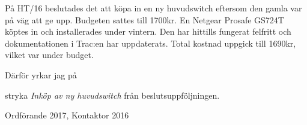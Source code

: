 \documentclass[../_main/handlingar.tex]{subfiles}
\begin{document}

På HT/16 beslutades det att köpa in en ny huvudswitch eftersom den gamla var på väg att ge upp. Budgeten sattes till 1700kr. En Netgear Prosafe GS724T köptes in och installerades under vintern. Den har hittills fungerat felfritt och dokumentationen i Trac:en har uppdaterats. Total kostnad uppgick till 1690kr, vilket var under budget.

Därför yrkar jag på

\begin{attsatser}
    \att stryka \emph{Inköp av ny huvudswitch} från beslutsuppföljningen.
\end{attsatser}

\begin{signatures}{1}
    \mvh
    \signature{Erik Månsson}{Ordförande 2017, Kontaktor 2016}
\end{signatures}
\end{document}
